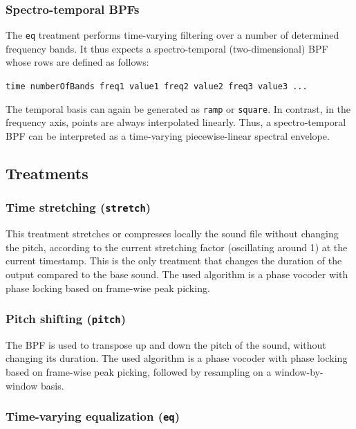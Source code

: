 \documentclass[oneside,10pt]{article}
\begin{document}
\subsubsection{Spectro-temporal BPFs}\label{sec:bpf_2d}

The \texttt{eq} treatment performs time-varying filtering over a number of
determined frequency bands. It thus expects a spectro-temporal
(two-dimensional) BPF whose rows are defined as follows:

\vspace{8pt}
\texttt{time numberOfBands freq1 value1 freq2 value2 freq3 value3 ...}
\vspace{8pt}

The temporal basis can again be generated as \texttt{ramp} or \texttt{square}.
In contrast, in the frequency axis, points are always interpolated linearly.
Thus, a spectro-temporal BPF can be interpreted as a time-varying
piecewise-linear spectral envelope.

\subsection{Treatments}\label{sec:treatments}

\subsubsection{Time stretching (\texttt{stretch})}

This treatment stretches or compresses locally the sound file without changing
the pitch, according to the current stretching factor (oscillating around 1) at
the current timestamp. This is the only treatment that changes the duration of
the output compared to the base sound. The used algorithm is a phase vocoder
with phase locking based on frame-wise peak picking.

\subsubsection{Pitch shifting (\texttt{pitch})}

The BPF is used to transpose up and down the pitch of the sound, without
changing its duration. The used algorithm is a phase vocoder with phase locking
based on frame-wise peak picking, followed by resampling on a window-by-window
basis.

\subsubsection{Time-varying equalization (\texttt{eq})}
\end{document}
